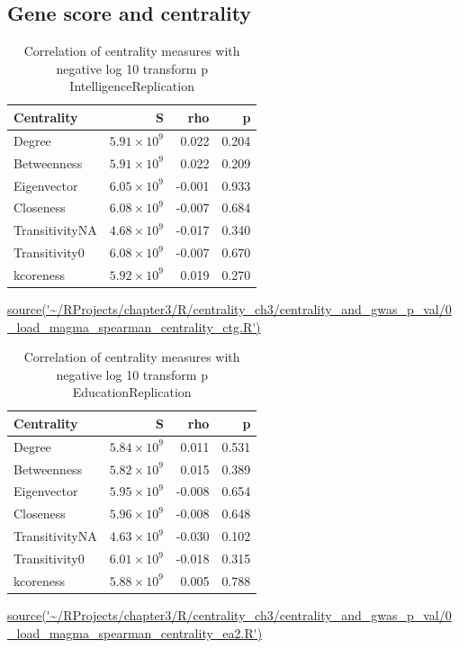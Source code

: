 \subsection{Gene score and centrality}
\clearpage

\begin{table}[ht]
\centering
\setlength{\extrarowheight}{2pt}
\begin{tabular}{lrrr}
  \toprule
Centrality & S & rho & p \\ 
  \midrule
Degree & $5.91 \times 10^{9}$ & 0.022 & 0.204 \\ 
  Betweenness & $5.91 \times 10^{9}$ & 0.022 & 0.209 \\ 
  Eigenvector & $6.05 \times 10^{9}$ & -0.001 & 0.933 \\ 
  Closeness & $6.08 \times 10^{9}$ & -0.007 & 0.684 \\ 
  TransitivityNA & $4.68 \times 10^{9}$ & -0.017 & 0.340 \\ 
  Transitivity0 & $6.08 \times 10^{9}$ & -0.007 & 0.670 \\ 
  kcoreness & $5.92 \times 10^{9}$ & 0.019 & 0.270 \\ 
   \bottomrule
\end{tabular}
\caption{Correlation of centrality measures with negative log 10 transform p IntelligenceReplication} 
\tiny\url{source('~/RProjects/chapter3/R/centrality_ch3/centrality_and_gwas_p_val/0_load_magma_spearman_centrality_ctg.R')}
\label{tab:Correlation of centrality measures with negative log 10 transform p IntelligenceReplication}
\end{table}


\begin{table}[ht]
\centering
\setlength{\extrarowheight}{2pt}
\begin{tabular}{lrrr}
  \toprule
Centrality & S & rho & p \\ 
  \midrule
Degree & $5.84 \times 10^{9}$ & 0.011 & 0.531 \\ 
  Betweenness & $5.82 \times 10^{9}$ & 0.015 & 0.389 \\ 
  Eigenvector & $5.95 \times 10^{9}$ & -0.008 & 0.654 \\ 
  Closeness & $5.96 \times 10^{9}$ & -0.008 & 0.648 \\ 
  TransitivityNA & $4.63 \times 10^{9}$ & -0.030 & 0.102 \\ 
  Transitivity0 & $6.01 \times 10^{9}$ & -0.018 & 0.315 \\ 
  kcoreness & $5.88 \times 10^{9}$ & 0.005 & 0.788 \\ 
   \bottomrule
\end{tabular}
\caption{Correlation of centrality measures with negative log 10 transform p EducationReplication} 
\tiny\url{source('~/RProjects/chapter3/R/centrality_ch3/centrality_and_gwas_p_val/0_load_magma_spearman_centrality_ea2.R')}
\label{tab:Correlation of centrality measures with negative log 10 transform p EducationReplication}
\end{table}

